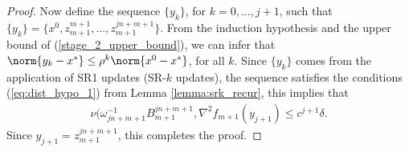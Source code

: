 \begin{proof}
    Now define the sequence $\{y_k\}$, for $k = 0, \dots, j + 1$, such that $\{y_k\} = \{x^0, z_{m+1}^{m+1}, \dots, z_{m+1}^{j n + m + 1} \}$. 
    From the induction hypothesis and the upper bound of (\ref{stage_2_upper_bound}), we can infer that $\norm{y_k - x^*} \leq \rho^k \norm{x^0 - x^*}$, for all $k$. 
    Since $\{y_k\}$ comes from the application of SR1 updates (SR-$k$ updates), the sequence satisfies the conditions (\ref{eq:dist_hypo_1}) from Lemma \ref{lemma:srk_recur}, this implies that
    \begin{align*}
           \nu(\omega_{j n + m + 1}^{-1} B_{m+1}^{j n + m + 1}, \nabla^2 f_{m+1}(y_{j+1}) \leq c^{j+1} \delta.
    \end{align*}
    Since $y_{j + 1} = z_{m+1}^{j n + m + 1}$, this completes the proof.
\end{proof}


